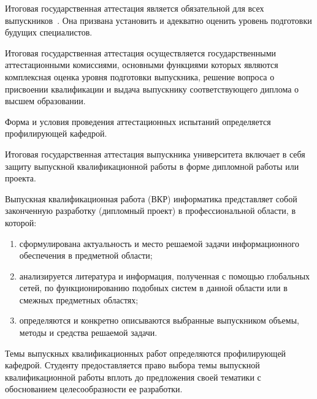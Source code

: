 \documentclass[14pt]{extarticle} %
\begin{document}
	

\newpage

\newpage

\newpage

\newpage
\renewcommand{\baselinestretch}{1.5}
\normalsize
\renewcommand{\contentsname}{СОДЕРЖАНИЕ}
\noindent\tableofcontents


Итоговая государственная аттестация является обязательной для всех выпускников~\cite{jech:lst,Ros,lacan:s20f}.
Она призвана установить и адекватно оценить уровень подготовки будущих 
специалистов.

Итоговая государственная аттестация осуществляется государственными аттестационными 
комиссиями, основными функциями которых являются комплексная оценка уровня 
подготовки выпускника, решение вопроса о присвоении квалификации и выдача 
выпускнику соответствующего диплома о высшем образовании.

Форма и условия проведения аттестационных испытаний определяется профилирующей кафедрой.

Итоговая государственная аттестация выпускника университета включает в себя
защиту выпускной квалификационной работы в форме дипломной работы или проекта.

\setlength{\itemsep}{0mm}
Выпускная квалификационная работа (ВКР) информатика 
представляет собой законченную разработку (дипломный проект) в профессиональной области, 
в которой: 

\begin{enumerate}[label=\arabic*)]  
\item сформулирована актуальность и место решаемой задачи 
информационного обеспечения в предметной области;
\item анализируется литература и информация, полученная с помощью 
глобальных сетей, по функционированию подобных систем в данной области 
или в смежных предметных областях; 
\item определяются и конкретно описываются выбранные выпускником объемы, 
методы и средства решаемой задачи.
\end{enumerate}


Темы выпускных квалификационных работ определяются профилирующей кафедрой. 
Студенту предоставляется право выбора темы выпускной квалификационной работы 
вплоть до предложения своей тематики с обоснованием целесообразности ее разработки.
\end{document}
